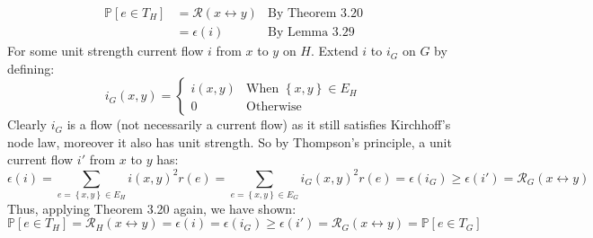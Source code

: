 \documentclass[a4paper, 11pt]{article}
\def\set#1{\left\{ #1 \right\}}
\begin{document}
\begin{align*}
	\mathbb{P}[e\in T_H] & = \mathcal{R}(x \leftrightarrow y) & \text{By Theorem 3.20} \\
	                     & = \epsilon(i) &\text{By Lemma 3.29}
\end{align*}
For some unit strength current flow $i$ from $x$ to $y$ on $H$. Extend $i$ to $i_G$ on $G$ by defining:
\[
	i_G(x,y) = \begin{cases}
		i(x,y) & \text{When $\set{x,y}\in E_H$} \\
		0      & \text{Otherwise}
	\end{cases}
\]
Clearly $i_G$ is a flow (not necessarily a current flow) as it still satisfies Kirchhoff's node law, moreover it also has unit strength. So by Thompson's principle, a unit current flow $i'$ from $x$ to $y$ has:
$$\epsilon(i)=\sum_{e=\set{x,y}\in E_H}i(x,y)^2r(e)
=\sum_{e=\set{x,y}\in E_G}i_G(x,y)^2r(e)
=\epsilon(i_G)\geq \epsilon(i')=\mathcal{R}_G(x\leftrightarrow y)$$
Thus, applying Theorem 3.20 again, we have shown:
\[
	\mathbb{P}[e\in T_H]  = \mathcal{R}_H(x \leftrightarrow y) = \epsilon(i)=\epsilon(i_G)\geq \epsilon(i')=\mathcal{R}_G(x\leftrightarrow y) = \mathbb{P}[e\in T_G]
\]
\end{document}
